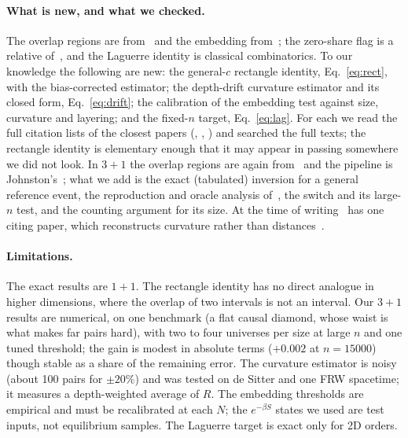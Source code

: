 \documentclass[11pt,a4paper]{article}
\begin{document}
\paragraph{What is new, and what we checked.} The overlap regions are from~\cite{BK24} and the embedding from~\cite{CloughEvans16}; the zero-share flag is a relative of~\cite{GlaserSurya13}, and the Laguerre identity is classical combinatorics. To our knowledge the following are new: the general-$c$ rectangle identity, Eq.~\eqref{eq:rect}, with the bias-corrected estimator; the depth-drift curvature estimator and its closed form, Eq.~\eqref{eq:drift}; the calibration of the embedding test against size, curvature and layering; and the fixed-$n$ target, Eq.~\eqref{eq:lag}. For each we read the full citation lists of the closest papers (\cite{BK24}, \cite{CloughEvans16}, \cite{Johnston08,Johnston09}) and searched the full texts; the rectangle identity is elementary enough that it may appear in passing somewhere we did not look. In $3+1$ the overlap regions are again from~\cite{BK24} and the pipeline is Johnston's~\cite{Johnston25}; what we add is the exact (tabulated) inversion for a general reference event, the reproduction and oracle analysis of~\cite{Johnston25}, the switch and its large-$n$ test, and the counting argument for its size. At the time of writing~\cite{Johnston25} has one citing paper, which reconstructs curvature rather than distances~\cite{Madsen26}.

\paragraph{Limitations.} The exact results are $1+1$. The rectangle identity has no direct analogue in higher dimensions, where the overlap of two intervals is not an interval. Our $3+1$ results are numerical, on one benchmark (a flat causal diamond, whose waist is what makes far pairs hard), with two to four universes per size at large $n$ and one tuned threshold; the gain is modest in absolute terms ($+0.002$ at $n=15000$) though stable as a share of the remaining error. The curvature estimator is noisy (about 100 pairs for $\pm20\%$) and was tested on de Sitter and one FRW spacetime; it measures a depth-weighted average of $R$. The embedding thresholds are empirical and must be recalibrated at each $N$; the $e^{-\beta S}$ states we used are test inputs, not equilibrium samples. The Laguerre target is exact only for 2D orders.
\end{document}
